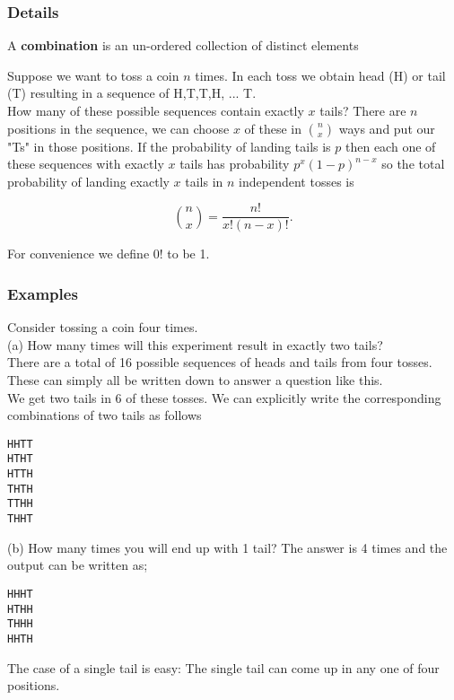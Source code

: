 \documentclass[12pt,a4paper]{article}
\theoremstyle{regla}
\theoremstyle{remark}
\theoremstyle{definition}
\theoremstyle{nonumberbreak}
\begin{document}
\subsubsection{Details}
\begin{defn}
A {\bf combination} is an un-ordered collection of distinct elements
\end{defn}
Suppose we want to toss a coin $n$ times. In each toss we obtain head (H) or tail (T) resulting in a sequence of H,T,T,H, ... T.\\

How many of these possible sequences contain exactly $x$  tails? There are $n$ positions in the sequence, we can choose $x$ of these in $\binom{n}{x}$ ways and put our "Ts" in those positions. If the probability of landing tails is $p$ then each one of these sequences with exactly $x$ tails has probability $p^x(1-p)^{n-x}$ so the total probability of landing exactly $x$ tails in $n$ independent tosses is

$$
{n \choose x}= \frac{{n!}}{{x!\left( {n - x} \right)!}} .
$$

For convenience we define $0!$ to be 1.

\subsubsection{Examples}
\begin{xmpl}
Consider tossing a coin four times. \\

(a) How many times will this experiment result in exactly two tails?\\

There are a total of 16 possible sequences of heads and tails from four tosses. These can simply all be written down to answer a question like this.\\

We get two tails in 6 of these tosses. We can explicitly write the corresponding 
combinations of two tails as follows
\begin{verbatim}
HHTT
HTHT
HTTH
THTH
TTHH
THHT
\end{verbatim}

(b) How many times you will end up with 1 tail? The answer is 4 times and the output can be written as;
\begin{verbatim}
HHHT
HTHH
THHH
HHTH 
\end{verbatim}
The case of a single tail is easy: The single tail can come up in any one of four positions.
\end{xmpl}
\end{document}
